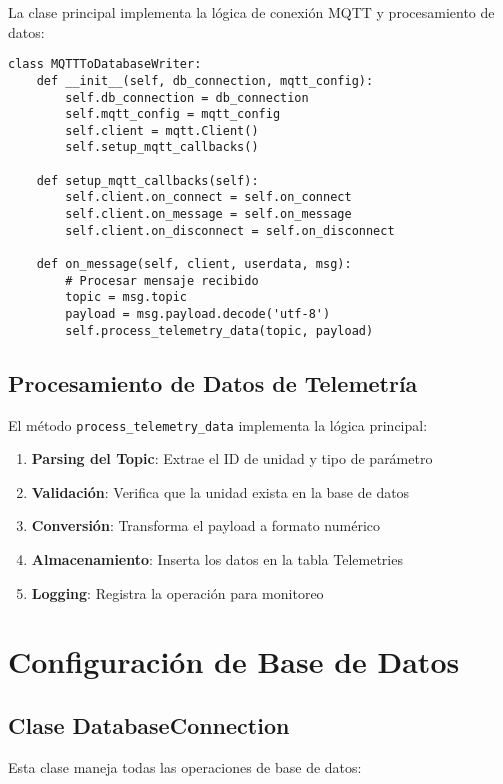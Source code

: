 La clase principal implementa la lógica de conexión MQTT y procesamiento de datos:

\begin{verbatim}
class MQTTToDatabaseWriter:
    def __init__(self, db_connection, mqtt_config):
        self.db_connection = db_connection
        self.mqtt_config = mqtt_config
        self.client = mqtt.Client()
        self.setup_mqtt_callbacks()
    
    def setup_mqtt_callbacks(self):
        self.client.on_connect = self.on_connect
        self.client.on_message = self.on_message
        self.client.on_disconnect = self.on_disconnect
    
    def on_message(self, client, userdata, msg):
        # Procesar mensaje recibido
        topic = msg.topic
        payload = msg.payload.decode('utf-8')
        self.process_telemetry_data(topic, payload)
\end{verbatim}

\subsection{Procesamiento de Datos de Telemetría}

El método \texttt{process\_telemetry\_data} implementa la lógica principal:

\begin{enumerate}[noitemsep]
    \item \textbf{Parsing del Topic}: Extrae el ID de unidad y tipo de parámetro
    \item \textbf{Validación}: Verifica que la unidad exista en la base de datos
    \item \textbf{Conversión}: Transforma el payload a formato numérico
    \item \textbf{Almacenamiento}: Inserta los datos en la tabla Telemetries
    \item \textbf{Logging}: Registra la operación para monitoreo
\end{enumerate}

\section{Configuración de Base de Datos}

\subsection{Clase DatabaseConnection}

Esta clase maneja todas las operaciones de base de datos:


